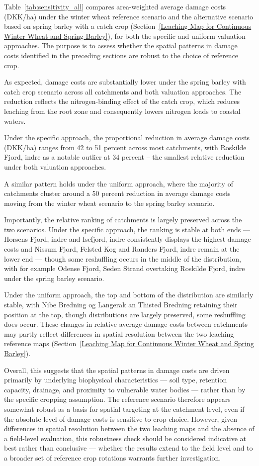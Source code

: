 \documentclass[12pt]{article}
\begin{document}
Table~\ref{tab:sensitivity_all} compares area-weighted average damage costs (DKK/ha) under the winter wheat reference scenario and the alternative scenario based on spring barley with a catch crop (Section~\ref{Leaching Map for Continuous Winter Wheat and Spring Barley}), for both the specific and uniform valuation approaches. 
The purpose is to assess whether the spatial patterns in damage costs identified in the preceding sections are robust to the choice of reference crop.

As expected, damage costs are substantially lower under the spring barley with catch crop scenario across all catchments and both valuation approaches. 
The reduction reflects the nitrogen-binding effect of the catch crop, which reduces leaching from the root zone and consequently lowers nitrogen loads to coastal waters. 

Under the specific approach, the proportional reduction in average damage costs (DKK/ha) ranges from 42 to 51 percent across most catchments, with Roskilde Fjord, indre as a notable outlier at 34 percent -- the smallest relative reduction under both valuation approaches. 

A similar pattern holds under the uniform approach, where the majority of catchments cluster around a 50 percent reduction in average damage costs moving from the winter wheat scenario to the spring barley scenario. 


Importantly, the relative ranking of catchments is largely preserved across the two scenarios. 
Under the specific approach, the ranking is stable at both ends --- Horsens Fjord, indre and Isefjord, indre consistently displays the highest damage costs and Nissum Fjord, Felsted Kog and Randers Fjord, indre remain at the lower end --- though some reshuffling occurs in the middle of the distribution, with for example Odense Fjord, Seden Strand overtaking Roskilde Fjord, indre under the spring barley scenario. 

Under the uniform approach, the top and bottom of the distribution are similarly stable, with Nibe Bredning og Langerak an Thisted Bredning retaining their position at the top, though distributions are largely preserved, some reshuffling does occur. These changes in relative average damage costs between catchments may partly reflect differences in spatial resolution between the two leaching reference maps (Section~\ref{Leaching Map for Continuous Winter Wheat and Spring Barley}).


Overall, this suggests that the spatial patterns in damage costs are driven primarily by underlying biophysical characteristics --- soil type, retention capacity, drainage, and proximity to vulnerable water bodies --- rather than by the specific cropping assumption. The reference scenario therefore appears somewhat robust as a basis for spatial targeting at the catchment level, even if the absolute level of damage costs is sensitive to crop choice. However, given differences in spatial resolution between the two leaching maps and the absence of a field-level evaluation, this robustness check should be considered indicative at best rather than conclusive --- whether the results extend to the field level and to a broader set of reference crop rotations warrants further investigation.
 
\end{document}
